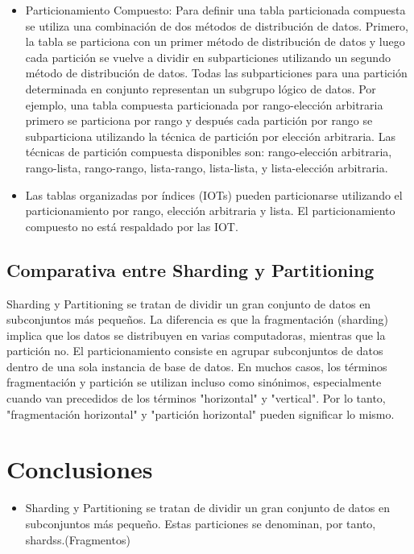 \documentclass{article}
\begin{document}
\begin{multicols}{2}
\begin{itemize}
   \item Particionamiento Compuesto: Para definir una tabla particionada compuesta se utiliza una
         combinación de dos métodos de distribución de datos. Primero, la tabla se particiona con un
         primer método de distribución de datos y luego cada partición se vuelve a dividir en
         subparticiones utilizando un segundo método de distribución de datos. Todas las subparticiones
         para una partición determinada en conjunto representan un subgrupo lógico de datos. Por
         ejemplo, una tabla compuesta particionada por rango-elección arbitraria primero se particiona
         por rango y después cada partición por rango se subparticiona utilizando la técnica de partición
         por elección arbitraria.
        Las técnicas de partición compuesta disponibles son: rango-elección arbitraria, rango-lista,
        rango-rango, lista-rango, lista-lista, y lista-elección arbitraria. 
    \item Las tablas organizadas por índices (IOTs) pueden particionarse utilizando el particionamiento
        por rango, elección arbitraria y lista. El particionamiento compuesto no está respaldado por las
        IOT.
\end{itemize}

\subsection{ Comparativa entre Sharding y Partitioning }

Sharding y Partitioning se tratan de dividir un gran conjunto de datos en subconjuntos más pequeños. La diferencia es que la fragmentación (sharding) implica que los datos se distribuyen en varias computadoras, mientras que la partición no. El particionamiento consiste en agrupar subconjuntos de datos dentro de una sola instancia de base de datos. En muchos casos, los términos fragmentación y partición se utilizan incluso como sinónimos, especialmente cuando van precedidos de los términos "horizontal" y "vertical". Por lo tanto, "fragmentación horizontal" y "partición horizontal" pueden significar lo mismo.




\section{Conclusiones}
\begin{itemize}
    \item   Sharding y Partitioning se tratan de dividir un gran conjunto de datos en subconjuntos más pequeño.
    Estas particiones se denominan, por tanto, shardss.(Fragmentos)
    

\end{itemize}
\end{multicols}
\end{document}
